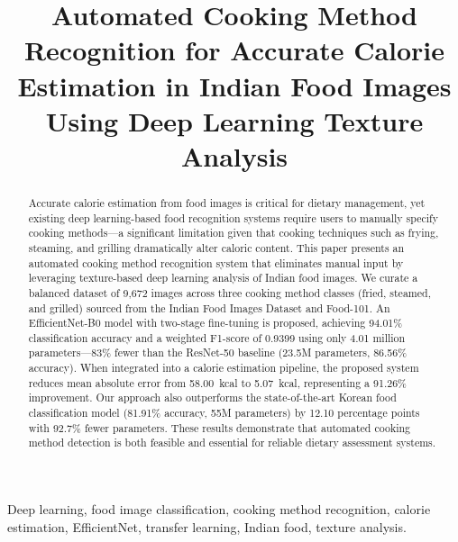 \documentclass[journal]{IEEEtran}
\begin{document}
\title{Automated Cooking Method Recognition for Accurate Calorie Estimation in Indian Food Images Using Deep Learning Texture Analysis}

\author{
\IEEEauthorblockN{}
}

\maketitle

\begin{abstract}
Accurate calorie estimation from food images is critical for dietary management, yet existing deep learning-based food recognition systems require users to manually specify cooking methods---a significant limitation given that cooking techniques such as frying, steaming, and grilling dramatically alter caloric content. This paper presents an automated cooking method recognition system that eliminates manual input by leveraging texture-based deep learning analysis of Indian food images. We curate a balanced dataset of 9,672 images across three cooking method classes (fried, steamed, and grilled) sourced from the Indian Food Images Dataset and Food-101. An EfficientNet-B0 model with two-stage fine-tuning is proposed, achieving 94.01\% classification accuracy and a weighted F1-score of 0.9399 using only 4.01 million parameters---83\% fewer than the ResNet-50 baseline (23.5M parameters, 86.56\% accuracy). When integrated into a calorie estimation pipeline, the proposed system reduces mean absolute error from 58.00~kcal to 5.07~kcal, representing a 91.26\% improvement. Our approach also outperforms the state-of-the-art Korean food classification model (81.91\% accuracy, 55M parameters) by 12.10 percentage points with 92.7\% fewer parameters. These results demonstrate that automated cooking method detection is both feasible and essential for reliable dietary assessment systems.
\end{abstract}

\begin{IEEEkeywords}
Deep learning, food image classification, cooking method recognition, calorie estimation, EfficientNet, transfer learning, Indian food, texture analysis.
\end{IEEEkeywords}
\end{document}
